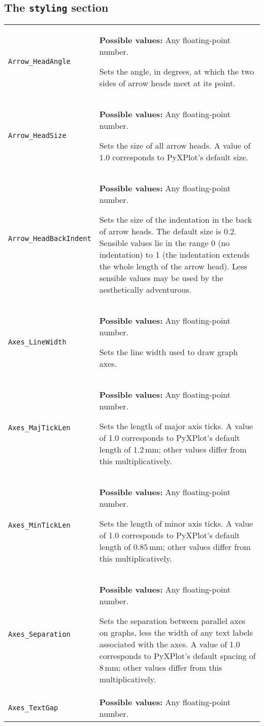 \subsection{The {\tt styling} section}

\begin{longtable}{p{3.4cm}p{9cm}}
{\tt Arrow\_HeadAngle} & {\bf Possible values:} Any floating-point number.
               
               Sets the angle, in degrees, at which the two sides of arrow heads meet at its point.
               \\
{\tt Arrow\_HeadSize} & {\bf Possible values:} Any floating-point number.

               Sets the size of all arrow heads. A value of 1.0 corresponds to PyXPlot's default size.
               \\
{\tt Arrow\_HeadBackIndent} & {\bf Possible values:} Any floating-point number.

               Sets the size of the indentation in the back of arrow heads. The default size is 0.2. Sensible values lie in the range 0 (no indentation) to 1 (the indentation extends the whole length of the arrow head). Less sensible values may be used by the aesthetically adventurous.
               \\
{\tt Axes\_LineWidth}  & {\bf Possible values:} Any floating-point number.

               Sets the line width used to draw graph axes.
               \\
{\tt Axes\_MajTickLen} & {\bf Possible values:} Any floating-point number.

               Sets the length of major axis ticks. A value of 1.0 corresponds to PyXPlot's default length of $1.2\,\mathrm{mm}$; other values differ from this multiplicatively.
               \\
{\tt Axes\_MinTickLen} & {\bf Possible values:} Any floating-point number.

               Sets the length of minor axis ticks. A value of 1.0 corresponds to PyXPlot's default length of $0.85\,\mathrm{mm}$; other values differ from this multiplicatively.
               \\
{\tt Axes\_Separation} & {\bf Possible values:} Any floating-point number.

               Sets the separation between parallel axes on graphs, less the width of any text labels associated with the axes. A value of 1.0 corresponds to PyXPlot's default spacing of $8\,\mathrm{mm}$; other values differ from this multiplicatively.
               \\
{\tt Axes\_TextGap} & {\bf Possible values:} Any floating-point number.


\end{longtable}
